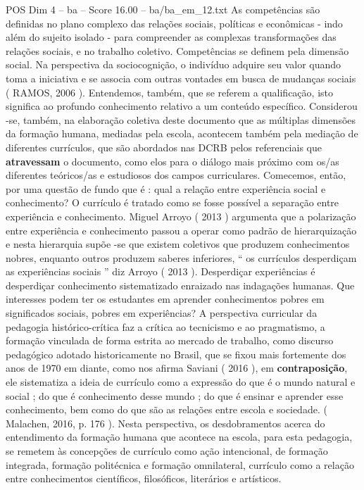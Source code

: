 \begin{textsample}{POS Dim 4 – ba – Score 16.00 – ba/ba\_em\_12.txt}
As competências são definidas no plano complexo das relações sociais, políticas e econômicas - indo além do sujeito isolado - para compreender as complexas transformações das relações sociais, e no trabalho coletivo.
Competências se definem pela dimensão social.
Na perspectiva da sociocognição, o indivíduo adquire seu valor quando toma a iniciativa e se associa com outras vontades em busca de mudanças sociais ( RAMOS, 2006 ).
Entendemos, também, que se referem a qualificação, isto significa ao profundo conhecimento relativo a um conteúdo específico.
Considerou -se, também, na elaboração coletiva deste documento que as múltiplas dimensões da formação humana, mediadas pela escola, acontecem também pela mediação de diferentes currículos, que são abordados nas DCRB pelos referenciais que \textbf{atravessam} o documento, como elos para o diálogo mais próximo com os/as diferentes teóricos/as e estudiosos dos campos curriculares.
Comecemos, então, por uma questão de fundo que é : qual a relação entre experiência social e conhecimento?
O currículo é tratado como se fosse possível a separação entre experiência e conhecimento.
Miguel Arroyo ( 2013 ) argumenta que a polarização entre experiência e conhecimento passou a operar como padrão de hierarquização e nesta hierarquia supõe -se que existem coletivos que produzem conhecimentos nobres, enquanto outros produzem saberes inferiores, “ os currículos desperdiçam as experiências sociais ” diz Arroyo ( 2013 ).
Desperdiçar experiências é desperdiçar conhecimento sistematizado enraizado nas indagações humanas.
Que interesses podem ter os estudantes em aprender conhecimentos pobres em significados sociais, pobres em experiências?
A perspectiva curricular da pedagogia histórico-crítica faz a crítica ao tecnicismo e ao pragmatismo, a formação vinculada de forma estrita ao mercado de trabalho, como discurso pedagógico adotado historicamente no Brasil, que se fixou mais fortemente dos anos de 1970 em diante, como nos afirma Saviani ( 2016 ), em \textbf{contraposição}, ele sistematiza a ideia de currículo como a expressão do que é o mundo natural e social ; do que é conhecimento desse mundo ; do que é ensinar e aprender esse conhecimento, bem como do que são as relações entre escola e sociedade. ( Malachen, 2016, p. 176 ).
Nesta perspectiva, os desdobramentos acerca do entendimento da formação humana que acontece na escola, para esta pedagogia, se remetem às concepções de currículo como ação intencional, de formação integrada, formação politécnica e formação omnilateral, currículo como a relação entre conhecimentos científicos, filosóficos, literários e artísticos.

\end{textsample}
